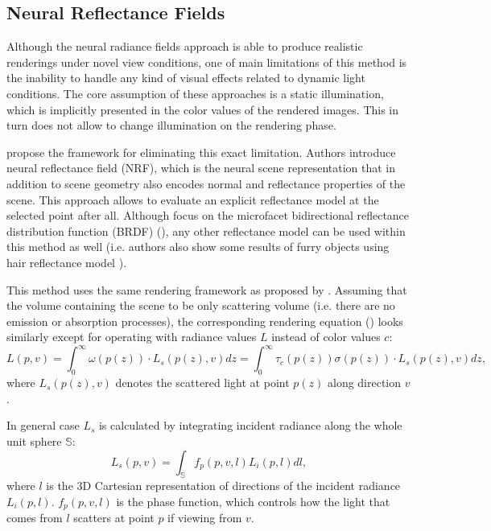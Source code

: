 \subsection{Neural Reflectance Fields}
\label{subsec:NRF}

Although the neural radiance fields approach is able to produce realistic renderings under novel view conditions,
one of main limitations of this method is the inability to handle any kind of visual effects related to dynamic light conditions.
The core assumption of these approaches is a static illumination,
which is implicitly presented in the color values of the rendered images.
This in turn does not allow to change illumination on the rendering phase.

\cite{bi2020neural} propose the framework for eliminating this exact limitation.
Authors introduce neural reflectance field (NRF), which is the neural scene representation
that in addition to scene geometry also encodes normal and reflectance properties of the scene.
This approach allows to evaluate an explicit reflectance model at the selected point after all.
Although \cite{bi2020neural} focus on the microfacet bidirectional reflectance distribution function (BRDF) (\cite{walter2007microfacet}),
any other reflectance model can be used within this method as well
(i.e. authors also show some results of furry objects using hair reflectance model \cite{kajiya1989fur}).

This method uses the same rendering framework as proposed by \cite{mildenhall2020nerf}.
Assuming that the volume containing the scene to be only scattering volume (i.e. there are no emission or absorption processes),
the corresponding rendering equation  (\cite{Novak18volumeSTAR}) looks similarly
except for operating with radiance values $L$ instead of color values $c$:
\begin{equation}
    L(p, v) = \int_0^\infty \omega(p(z)) \cdot L_s(p(z), v) dz = \int_0^\infty \tau_c(p(z)) \sigma(p(z)) \cdot L_s(p(z), v)dz,
\end{equation}
where $L_s(p(z), v)$ denotes the scattered light at point $p(z)$ along direction $v$.

In general case $L_s$ is calculated by integrating incident radiance along the whole unit sphere $\mathbb{S}$:
\begin{equation}
    \label{eq:radiance_Li}
    L_s(p, v) = \int_\mathbb{S} f_p(p, v, l) L_i(p, l)dl,
\end{equation}
where $l$ is the 3D Cartesian representation of directions of the incident radiance $L_i(p, l)$.
$f_p(p, v, l)$ is the phase function, which controls
how the light that comes from $l$ scatters at point $p$ if viewing from $v$.

